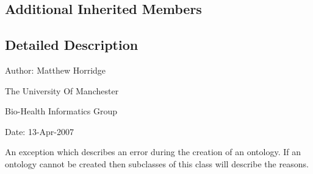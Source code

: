 \subsection*{Additional Inherited Members}


\subsection{Detailed Description}
Author\-: Matthew Horridge\par
 The University Of Manchester\par
 Bio-\/\-Health Informatics Group\par
 Date\-: 13-\/\-Apr-\/2007\par
\par
 An exception which describes an error during the creation of an ontology. If an ontology cannot be created then subclasses of this class will describe the reasons. 

